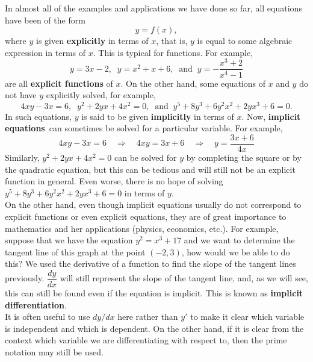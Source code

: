 \documentclass{book}
\begin{document}
In almost all of the examples and applications we have done so far, all equations have been of the form \[y = f(x),\] where $y$ is given \textbf{explicitly} in terms of $x$, that is, $y$ is equal to some algebraic expression in terms of $x$. This is typical for functions. For example, \[y = 3x-2,\;\; y =x^2 + x +6,\;\; \mbox{and}\;\; y = -\dfrac{x^3+2}{x^4-1}\] are all \textbf{explicit functions} of $x$. On the other hand, some equations of $x$ and $y$ do not have $y$ explicitly solved, for example, \[4xy - 3x =6,\;\; y^2 + 2yx + 4x^2 = 0,\;\; \mbox{and}\;\; y^5 + 8y^3 + 6y^2x^2 + 2yx^3 + 6 = 0.\] In such equations, $y$ is said to be given \textbf{implicitly} in terms of $x$. Now, \textbf{implicit equations}\footnotemark\  can sometimes be solved for a particular variable. For example,
\[4xy-3x = 6 \quad\Rightarrow\quad 4xy = 3x+6 \quad\Rightarrow\quad y = \dfrac{3x+6}{4x}\]
Similarly, $y^2 + 2yx + 4x^2 = 0$ can be solved for $y$ by completing the square or by the quadratic equation, but this can be tedious and will still not be an explicit function in general. Even worse, there is no hope of solving $y^5 + 8y^3 + 6y^2x^2 + 2yx^3 + 6 = 0$ in terms of $y$. \\

On the other hand, even though implicit equations usually do not correspond to explicit functions or even explicit equations, they are of great importance to mathematics and her applications (physics, economics, etc.). For example, suppose that we have the equation $y^2 = x^3 + 17$ and we want to determine the tangent line of this graph at the point $(-2,3)$, how would we be able to do this? We used the derivative of a function to find the slope of the tangent lines previously. $\dfrac{dy}{dx}$ will still represent the slope of the tangent line, and, as we will see, this can still be found even if the equation is implicit. This is known as \textbf{implicit differentiation}.\\

It is often useful to use $dy/dx$ here rather than $y'$ to make it clear which variable is independent and which is dependent. On the other hand, if it is clear from the context which variable we are differentiating with respect to, then the prime notation may still be used. 
\end{document}
